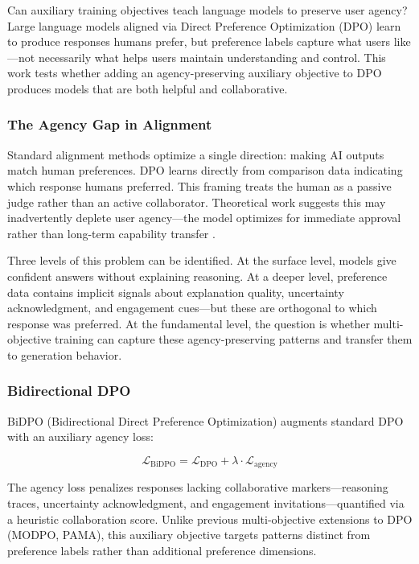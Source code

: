 
Can auxiliary training objectives teach language models to preserve user agency? Large language models aligned via Direct Preference Optimization (DPO) learn to produce responses humans prefer, but preference labels capture what users like---not necessarily what helps users maintain understanding and control. This work tests whether adding an agency-preserving auxiliary objective to DPO produces models that are both helpful and collaborative.

\subsubsection{The Agency Gap in Alignment}

Standard alignment methods optimize a single direction: making AI outputs match human preferences. DPO learns directly from comparison data indicating which response humans preferred. This framing treats the human as a passive judge rather than an active collaborator. Theoretical work suggests this may inadvertently deplete user agency---the model optimizes for immediate approval rather than long-term capability transfer \citep{mitelut2023intent}.

Three levels of this problem can be identified. At the surface level, models give confident answers without explaining reasoning. At a deeper level, preference data contains implicit signals about explanation quality, uncertainty acknowledgment, and engagement cues---but these are orthogonal to which response was preferred. At the fundamental level, the question is whether multi-objective training can capture these agency-preserving patterns and transfer them to generation behavior.

\subsubsection{Bidirectional DPO}

BiDPO (Bidirectional Direct Preference Optimization) augments standard DPO with an auxiliary agency loss:

$$\mathcal{L}_{\text{BiDPO}} = \mathcal{L}_{\text{DPO}} + \lambda \cdot \mathcal{L}_{\text{agency}}$$

The agency loss penalizes responses lacking collaborative markers---reasoning traces, uncertainty acknowledgment, and engagement invitations---quantified via a heuristic collaboration score. Unlike previous multi-objective extensions to DPO (MODPO, PAMA), this auxiliary objective targets patterns distinct from preference labels rather than additional preference dimensions.

